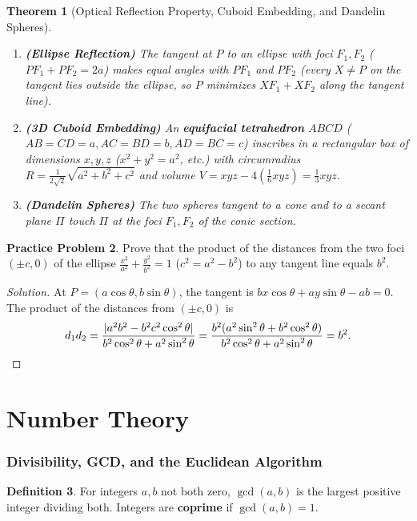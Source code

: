\documentclass[11pt]{article}
\theoremstyle{plain}
\newtheorem{theorem}{Theorem}[section]
\theoremstyle{definition}
\newtheorem{definition}[theorem]{Definition}
\newtheorem{problem}[theorem]{Practice Problem}
\newenvironment{solution}{\begin{proof}[Solution]}{\end{proof}}
\begin{document}
\begin{theorem}[Optical Reflection Property, Cuboid Embedding, and Dandelin Spheres]
\leavevmode
\begin{enumerate}[label=(\alph*)]
\item \textbf{(Ellipse Reflection)} The tangent at $P$ to an ellipse with foci $F_1, F_2$ ($PF_1+PF_2=2a$) makes equal angles with $PF_1$ and $PF_2$ (every $X \ne P$ on the tangent lies outside the ellipse, so $P$ minimizes $XF_1+XF_2$ along the tangent line).
\item \textbf{(3D Cuboid Embedding)} An \textbf{equifacial tetrahedron} $ABCD$ ($AB=CD=a, AC=BD=b, AD=BC=c$) inscribes in a rectangular box of dimensions $x,y,z$ ($x^2+y^2=a^2$, etc.) with circumradius $R = \frac{1}{2\sqrt{2}}\sqrt{a^2+b^2+c^2}$ and volume $V = xyz - 4(\frac{1}{6}xyz) = \frac{1}{3}xyz$.
\item \textbf{(Dandelin Spheres)} The two spheres tangent to a cone and to a secant plane $\Pi$ touch $\Pi$ at the foci $F_1, F_2$ of the conic section.
\end{enumerate}
\end{theorem}

\begin{problem}
Prove that the product of the distances from the two foci $(\pm c, 0)$ of the ellipse $\frac{x^2}{a^2}+\frac{y^2}{b^2}=1$ ($c^2=a^2-b^2$) to any tangent line equals $b^2$.
\end{problem}
\begin{solution}
At $P = (a\cos\theta, b\sin\theta)$, the tangent is $bx\cos\theta + ay\sin\theta - ab = 0$. The product of the distances from $(\pm c, 0)$ is
\[
d_1 d_2 = \frac{|a^2b^2 - b^2c^2\cos^2\theta|}{b^2\cos^2\theta + a^2\sin^2\theta}
= \frac{b^2(a^2\sin^2\theta + b^2\cos^2\theta)}{b^2\cos^2\theta + a^2\sin^2\theta} = b^2. \qedhere
\]
\end{solution}
\part{Number Theory}

\section{Divisibility, GCD, and the Euclidean Algorithm}

\begin{definition}
For integers $a, b$ not both zero, $\gcd(a,b)$ is the largest positive integer
dividing both. Integers are \textbf{coprime} if $\gcd(a,b)=1$.
\end{definition}
\end{document}

